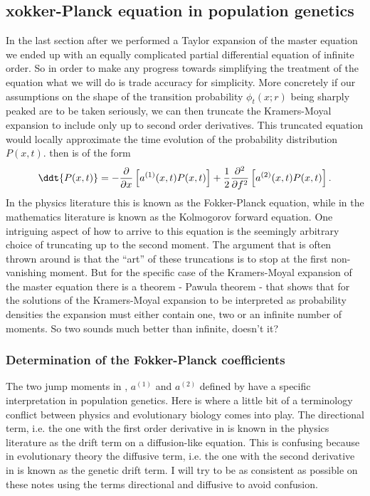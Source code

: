\subsection{xokker-Planck equation in population genetics}

In the last section after we performed a Taylor expansion of the master
equation we ended up with an equally complicated partial differential equation
of infinite order. So in order to make any progress towards simplifying the
treatment of the equation what we will do is trade accuracy for simplicity.
More concretely if our assumptions on the shape of the transition probability
$\phi_t(x; r)$ being sharply peaked are to be taken seriously, we can then
truncate the Kramers-Moyal expansion to include only up to second order
derivatives. This truncated equation would locally approximate the time
evolution of the probability distribution $P(x, t)$. 
then is of the form
\begin{equation}
  \ddt{P(x, t)} = - {\partial \over \partial x}
  \left[
  a^{(1)}(x, t) P(x, t)
  \right] +
  {1 \over 2}{\partial^2 \over \partial f^2}
  \left[
  a^{(2)}(x, t) P(x, t)
  \right].
  \label{eq_fokker_planck}
\end{equation}
In the physics literature this is known as the Fokker-Planck equation, while in
the mathematics literature is known as the Kolmogorov forward equation. One
intriguing aspect of how to arrive to this equation is the seemingly arbitrary
choice of truncating up to the second moment. The argument that is often thrown
around is that the ``art'' of these truncations is to stop at the first
non-vanishing moment. But for the specific case of the Kramers-Moyal expansion
of the master equation there is a theorem - Pawula theorem - that shows that
for the solutions of the Kramers-Moyal expansion to be interpreted as
probability densities the expansion must either contain one, two or an infinite
number of moments. So two sounds much better than infinite, doesn't it?

\subsubsection{Determination of the Fokker-Planck coefficients}

The two jump moments in , $a^{(1)}$ and $a^{(2)}$
defined by  have a specific interpretation in population
genetics. Here is where a little bit of a terminology conflict between physics
and evolutionary biology comes into play. The directional term, i.e. the one
with the first order derivative in  is known in the
physics literature as the drift term on a diffusion-like equation. This is
confusing because in evolutionary theory the diffusive term, i.e. the one with
the second derivative in  is known as the genetic drift
term. I will try to be as consistent as possible on these notes using the terms
directional and diffusive to avoid confusion.

